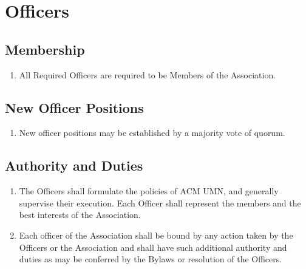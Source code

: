 \section{Officers}

\subsection{Membership}
\begin{enumerate}
	\item All Required Officers are required to be Members of the Association.
\end{enumerate}

\subsection{New Officer Positions}
\begin{enumerate}
	\item New officer positions may be established by a majority vote of quorum.
\end{enumerate}

\subsection{Authority and Duties}
\begin{enumerate}
	\item The Officers shall formulate the policies of ACM UMN, and generally supervise their execution. Each Officer shall represent the members and the best interests of the Association.
	\item Each officer of the Association shall be bound by any action taken by the Officers or the Association and shall have such additional authority and duties as may be conferred by the Bylaws or resolution of the Officers.
\end{enumerate}


